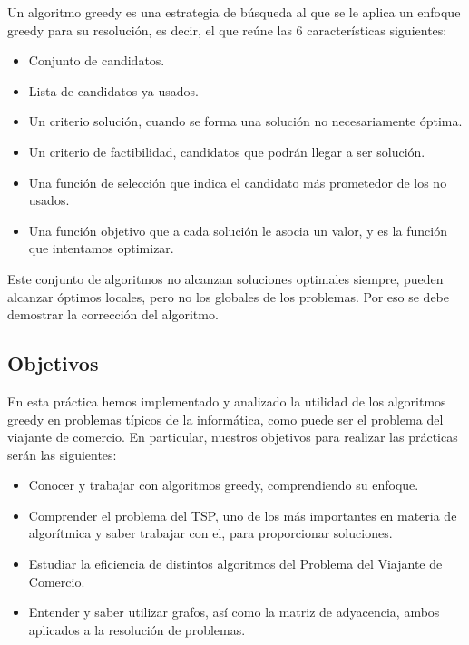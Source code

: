 Un algoritmo greedy es una estrategia de búsqueda al que se le aplica un enfoque 
greedy para su resolución, es decir, el que reúne las 6 características siguientes:

\begin{itemize}
    \item Conjunto de candidatos.
    \item Lista de candidatos ya usados.
    \item Un criterio solución, cuando se forma una solución no necesariamente óptima.
    \item Un criterio de factibilidad, candidatos que podrán llegar a ser solución.
    \item Una función de selección que indica el candidato más prometedor de los no usados.
    \item Una función objetivo que a cada solución le asocia un valor, y es la función que intentamos optimizar.
\end{itemize}

Este conjunto de algoritmos no alcanzan soluciones optimales siempre, pueden 
alcanzar óptimos locales, pero no los globales de los problemas.
Por eso se debe demostrar la corrección del algoritmo.

\subsection{Objetivos}

En esta práctica hemos implementado y analizado la utilidad de los algoritmos 
greedy en problemas típicos de la informática, como puede ser el problema
del viajante de comercio. En particular, nuestros objetivos para realizar
las prácticas serán las siguientes:

\begin{itemize}
    \item Conocer y trabajar con algoritmos greedy, comprendiendo su enfoque.
    \item Comprender el problema del TSP, uno de los más importantes en materia de algorítmica y saber trabajar con el, para proporcionar soluciones.
    \item Estudiar la eficiencia de distintos algoritmos del Problema del Viajante de Comercio.
    \item Entender y saber utilizar grafos, así como la matriz de adyacencia, ambos aplicados a la resolución de problemas.
\end{itemize}